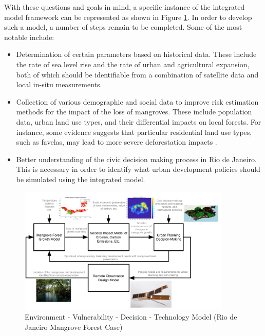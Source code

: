 With these questions and goals in mind, a specific instance of the integrated model framework can be represented as shown in Figure \ref{fig:rio-evdt-flow}. In order to develop such a model, a number of steps remain to be completed. Some of the most notable include:

\begin{itemize}[itemsep=0pt,parsep=0pt]
    \item Determination of certain parameters based on historical data. These include the rate of sea level rise and the rate of urban and agricultural expansion, both of which should be identifiable from a combination of satellite data and local in-situ measurements.
    \item Collection of various demographic and social data to improve risk estimation methods for the impact of the loss of mangroves. These include population data, urban land use types, and their differential impacts on local forests. For instance, some evidence suggests that particular residential land use types, such as favelas, may lead to more severe deforestation impacts \cite{herzogLocalAssessmentRio2013}.
    \item Better understanding of the civic decision making process in Rio de Janeiro. This is necessary in order to identify what urban development policies should be simulated using the integrated model.
\end{itemize}


\begin{figure}[!htb]
\centering
\includegraphics[width=0.9\textwidth]{Figures/chap4/MangroveModelFlow.png}
\caption[EVDT Model (Rio de Janeiro Mangrove Forest Case)]{Environment - Vulnerability - Decision - Technology Model (Rio de Janeiro Mangrove Forest Case)}
\label{fig:rio-evdt-flow}
\end{figure}


